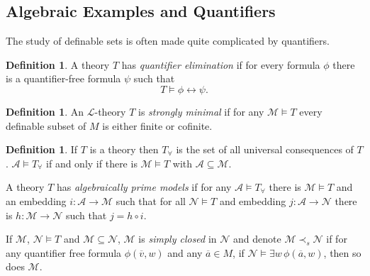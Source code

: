 \documentclass{amsart}
\theoremstyle{definition}
\newtheorem{definition}[theorem]{Definition}
\numberwithin{equation}{section}
\begin{document}
\subsection{Algebraic Examples and Quantifiers}

\begin{center}
\begin{tcolorbox}[title = Properties of theories]
\begin{center}
\end{center}
\end{tcolorbox}
\end{center}

The study of definable sets is often made quite complicated by quantifiers.

\begin{definition}
  A theory $T$ has \emph{quantifier elimination} if for every formula $\phi$ there is a quantifier-free formula $\psi$ such that
  \[
    T \models \phi \leftrightarrow \psi.
  \]
\end{definition}

\begin{definition}
  An $\mathcal{L}$-theory $T$ is \emph{strongly minimal} if for any $\mathcal{M} \models T$
  every definable subset of $M$ is either finite or cofinite.
\end{definition}

\begin{definition}
  If $T$ is a theory then $T_{\forall}$ is the set of all universal consequences of $T$.
  $\mathcal{A} \models T_{\forall}$ if and only if there is $\mathcal{M} \models T$ with $\mathcal{A} \subseteq \mathcal{M}$.

  A theory $T$ has \emph{algebraically prime models}
  if for any $\mathcal{A} \models T_{\forall}$ there is
  $\mathcal{M} \models T$ and an embedding $i:\mathcal{A} \to \mathcal{M}$
  such that for all $\mathcal{N} \models T$ and embedding $j: \mathcal{A} \to \mathcal{N}$
  there is $h: \mathcal{M} \to \mathcal{N}$ such that $j = h \circ i$.

  If $\mathcal{M}$, $\mathcal{N} \models T$ and $\mathcal{M} \subseteq \mathcal{N}$,
  $\mathcal{M}$ is \emph{simply closed} in $\mathcal{N}$ and denote
  $\mathcal{M} \prec_s \mathcal{N}$ if for any quantifier free formula
  $\phi(\overline{v},w)$ and any $\overline{a} \in M$,
  if $\mathcal{N} \models \exists w\, \phi(\overline{a},w)$,
  then so does $\mathcal{M}$.
\end{definition}
\end{document}

